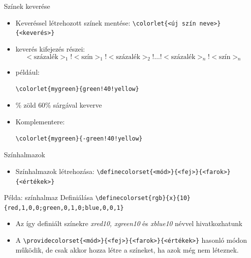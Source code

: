 \documentclass[aspectratio=1610, dvipsnames, xcolor=table]{beamer}
\begin{document}
    \begin{frame}[fragile]{Színek keverése}
        \begin{itemize}
            \item {}Keveréssel létrehozott színek mentése: \verb!\colorlet{<új szín neve>}{<keverés>}!
            \item {}keverés kifejezés részei: $$<\text{százalék}>_1!<\text{szín}>_1!<\text{százalék}>_2!\ldots!<\text{százalék}>_n!<\text{szín}>_n$$
            \item {}például: \begin{verbatim}\colorlet{mygreen}{green!40!yellow}\end{verbatim} 
            \item {}\% zöld 60\% sárgával keverve  
            \item {}Komplementere:  \begin{verbatim}\colorlet{mygreen}{-green!40!yellow}\end{verbatim} 
        \end{itemize}
    \end{frame}
    

    \begin{frame}[fragile]{Színhalmazok}
        \begin{itemize}
            \item {}Színhalmazok létrehozása: \verb!\definecolorset{<mód>}{<fej>}{<farok>}{<értékek>}!
        \end{itemize}
         \begin{exampleblock}{Példa: színhalmaz Definiálása}
            \verb!\definecolorset{rgb}{x}{10}{red,1,0,0;green,0,1,0;blue,0,0,1}!
        \end{exampleblock}
            
        \begin{itemize}
            \item {} Az így definiált színekre \textit{xred10, xgreen10} és \textit{xblue10} névvel hivatkozhatunk
            \item {} A \verb!\providecolorset{<mód>}{<fej>}{<farok>}{<értékek>}! hasonló módon működik, de csak akkor hozza létre a színeket, ha azok még nem léteznek.
        \end{itemize}        
    \end{frame}
\end{document}
